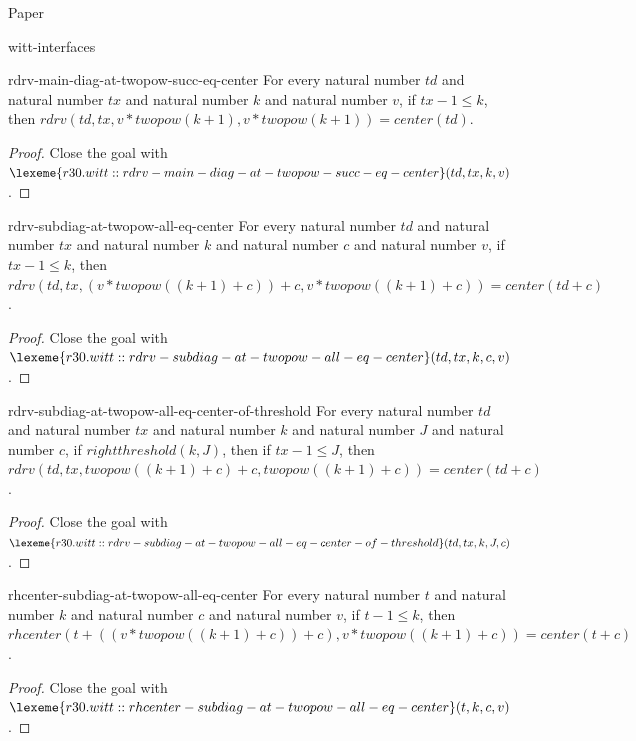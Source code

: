 \begin{lexlean}{Paper}
\begin{section}{witt-interfaces}
  \begin{theorem}{rdrv-main-diag-at-twopow-succ-eq-center}
  For every natural number \(td\) and natural number \(tx\) and natural number \(k\) and natural number \(v\), if \(tx - 1 ≤ k\), then \(rdrv(td, tx, v * twopow(k + 1), v * twopow(k + 1)) = center(td)\).
  \begin{proof}
  Close the goal with \(\lexeme{r30.witt::rdrv-main-diag-at-twopow-succ-eq-center}(td, tx, k, v)\).
  \end{proof}
  \end{theorem}

  \begin{theorem}{rdrv-subdiag-at-twopow-all-eq-center}
  For every natural number \(td\) and natural number \(tx\) and natural number \(k\) and natural number \(c\) and natural number \(v\), if \(tx - 1 ≤ k\), then \(rdrv(td, tx, (v * twopow((k + 1) + c)) + c, v * twopow((k + 1) + c)) = center(td + c)\).
  \begin{proof}
  Close the goal with \(\lexeme{r30.witt::rdrv-subdiag-at-twopow-all-eq-center}(td, tx, k, c, v)\).
  \end{proof}
  \end{theorem}

  \begin{theorem}{rdrv-subdiag-at-twopow-all-eq-center-of-threshold}
  For every natural number \(td\) and natural number \(tx\) and natural number \(k\) and natural number \(J\) and natural number \(c\), if \(rightthreshold(k, J)\), then if \(tx - 1 ≤ J\), then \(rdrv(td, tx, twopow((k + 1) + c) + c, twopow((k + 1) + c)) = center(td + c)\).
  \begin{proof}
  Close the goal with \(\lexeme{r30.witt::rdrv-subdiag-at-twopow-all-eq-center-of-threshold}(td, tx, k, J, c)\).
  \end{proof}
  \end{theorem}

  \begin{theorem}{rhcenter-subdiag-at-twopow-all-eq-center}
  For every natural number \(t\) and natural number \(k\) and natural number \(c\) and natural number \(v\), if \(t - 1 ≤ k\), then \(rhcenter(t + ((v * twopow((k + 1) + c)) + c), v * twopow((k + 1) + c)) = center(t + c)\).
  \begin{proof}
  Close the goal with \(\lexeme{r30.witt::rhcenter-subdiag-at-twopow-all-eq-center}(t, k, c, v)\).
  \end{proof}
  \end{theorem}


\end{section}
\end{lexlean}
